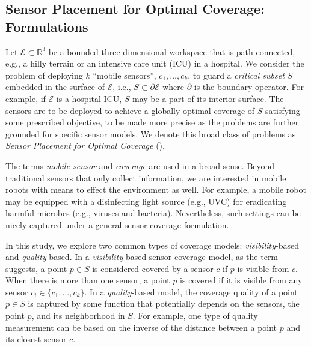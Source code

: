\subsection{Sensor Placement for Optimal Coverage: Formulations}
Let $\mathcal E \subset \mathbb R^3$ be a bounded three-dimensional workspace that is path-connected, e.g., a hilly terrain or an intensive care unit (ICU) in a hospital. We consider the problem of deploying $k$ ``mobile sensors'', $c_1, \ldots, c_k$, to guard a \emph{critical subset} $S$ embedded in the surface of $\mathcal E$, i.e., $S \subset \partial \mathcal E$ where $\partial$ is the boundary operator. For example, if $\mathcal E$ is a hospital ICU, $S$ may be a part of its interior surface. The sensors are to be deployed to achieve a globally optimal coverage of $S$ satisfying some prescribed objective, to be made more precise as the problems are further grounded for specific sensor models. We denote this broad class of problems as \emph{Sensor Placement for Optimal Coverage} (\spoc). 
%

The terms \emph{mobile sensor} and \emph{coverage} are used in a broad sense. Beyond traditional sensors that only collect information, we are interested in mobile robots with means to effect the environment as well. For example, a mobile robot may be equipped with a disinfecting light source (e.g., UVC) for eradicating harmful microbes (e.g., viruses and bacteria). Nevertheless, such settings can be nicely captured under a general sensor coverage formulation. 

In this study, we explore two common types of coverage models: \emph{visibility}-based and \emph{quality}-based. 
%
In a \emph{visibility}-based sensor coverage model, as the term suggests, a point $p \in S$ is considered covered by a sensor $c$ if $p$ is visible from $c$.
When there is more than one sensor, a point $p$ is covered if it is visible from any sensor $c_i \in \{c_1, \ldots, c_k\}$. 
%
In a \emph{quality}-based model, the coverage quality of a point $p \in S$ is captured by some function that potentially depends on the sensors, the point $p$, and its neighborhood in $S$. For example, one type of quality measurement can be based on the inverse of the distance between a point $p$ and its closest sensor $c$. 

